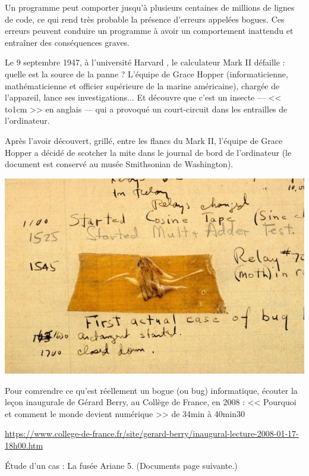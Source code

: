 \documentclass[a4paper,10pt]{report}
\theoremstyle{exo}
\theoremstyle{exercice}
\newcommand\pointsuite[1]{\leavevmode\hbox to#1{\dotfill}} %
\begin{document}
Un programme peut comporter jusqu'à plusieurs centaines de millions de lignes de code, ce qui rend très probable la présence d'erreurs appelées bogues. Ces erreurs peuvent conduire un programme à avoir un comportement inattendu et entraîner des conséquences graves.


\begin{multicols}{2}Le 9 septembre 1947, à l'université Harvard , le calculateur Mark II défaille : quelle est la source de la panne ? L'équipe de Grace Hopper (informaticienne, mathématicienne et officier supérieure de la marine américaine), chargée de l'appareil, lance ses investigations... Et découvre que c'est un insecte — << \pointsuite{1cm} >> en anglais — qui a provoqué un court-circuit dans les entrailles de l'ordinateur.

Après l'avoir découvert, grillé, entre les flancs du Mark II, l'équipe de Grace Hopper a décidé de scotcher la mite dans le journal de bord de l’ordinateur (le document est conservé au musée Smithsonian de Washington).

\includegraphics[width=\linewidth]{image/bug.jpg}
\end{multicols}

Pour comrendre ce qu'est réellement un bogue (ou bug) informatique, écouter la leçon inaugurale de Gérard Berry, au Collège de France, en 2008 : << Pourquoi et comment le monde devient numérique >> de 34min à 40min30

\href{https://www.college-de-france.fr/site/gerard-berry/inaugural-lecture-2008-01-17-18h00.htm}{https://www.college-de-france.fr/site/gerard-berry/inaugural-lecture-2008-01-17-18h00.htm}

Étude d'un cas : La fusée Ariane 5. (Documents page suivante.)
\end{document}
